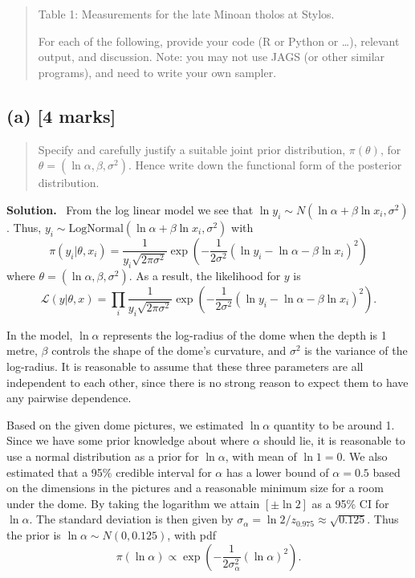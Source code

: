 \documentclass{article}
\newenvironment{question}{\begin{quote}\small}{\end{quote}}
\newcommand{\solution}{\noindent\textbf{Solution.}\ }
\begin{document}
\begin{question}
\begin{center}
Table 1: Measurements for the late Minoan tholos at Stylos.
\end{center}

For each of the following, provide your code (R or Python or \dots), relevant output, and discussion.
Note: you may not use JAGS (or other similar programs), and need to write your own sampler.
\end{question}

\subsection*{(a) [4 marks]}

\begin{question}
Specify and carefully justify a suitable joint prior distribution, $\pi(\theta)$, for $\theta = (\ln\alpha, \beta, \sigma^2)$. Hence write down the functional form of the posterior distribution.
\end{question}

\solution
From the log linear model we see that $\ln y_i \sim N(\ln\alpha + \beta\ln x_i, \sigma^2)$.
Thus, $y_i \sim \mathrm{LogNormal}(\ln\alpha + \beta\ln x_i, \sigma^2)$ with
\[
    \pi(y_i|\theta,x_i) = \frac{1}{y_i\sqrt{2\pi\sigma^2}} \exp(-\frac{1}{2\sigma^2} (\ln y_i - \ln\alpha - \beta\ln x_i)^2)
\]
where $\theta = (\ln\alpha, \beta, \sigma^2)$.
As a result, the likelihood for $y$ is
\[
    \mathcal{L}(y|\theta,x) = \prod_i \frac{1}{y_i\sqrt{2\pi\sigma^2}} \exp(-\frac{1}{2\sigma^2} (\ln y_i - \ln\alpha - \beta\ln x_i)^2).
\]

In the model, $\ln\alpha$ represents the log-radius of the dome when the depth is 1 metre, $\beta$ controls the shape of the dome's curvature, and $\sigma^2$ is the variance of the log-radius. It is reasonable to assume that these three parameters are all independent to each other, since there is no strong reason to expect them to have any pairwise dependence.

Based on the given dome pictures, we estimated $\ln\alpha$ quantity to be around 1. Since we have some prior knowledge about where $\alpha$ should lie, it is reasonable to use a normal distribution as a prior for $\ln{\alpha}$, with mean of $\ln 1 = 0$.
We also estimated that a 95\% credible interval for $\alpha$ has a lower bound of $\alpha = 0.5$ based on the dimensions in the pictures and a reasonable minimum size for a room under the dome.
By taking the logarithm we attain $[\pm\ln2]$ as a 95\% CI for $\ln\alpha$.
The standard deviation is then given by $\sigma_\alpha = \ln 2/z_{0.975} \approx \sqrt{0.125}$.
Thus the prior is $\ln\alpha \sim N(0, 0.125)$, with pdf
\[
    \pi(\ln\alpha) \propto \exp(-\frac{1}{2\sigma_\alpha^2} (\ln\alpha)^2).
\]
\end{document}

